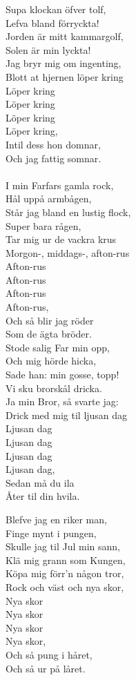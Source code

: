 \vspace{10pt}
Supa klockan öfver tolf,\\
Lefva bland förryckta!\\
Jorden är mitt kammargolf,\\
Solen är min lyckta!\\
Jag bryr mig om ingenting,\\
Blott at hjernen löper kring \\
	Löper kring\\
	Löper kring\\
	Löper kring\\
	Löper kring,\\
Intil dess hon domnar,\\
Och jag fattig somnar.\\
	 \\
I min Farfars gamla rock,\\
Hål uppå armbågen,\\
Står jag bland en lustig flock,\\
Super bara rågen,\\
Tar mig ur de vackra krus\\
Morgon-, middags-, afton-rus\\
	 Afton-rus\\
	 Afton-rus\\
	 Afton-rus\\
	 Afton-rus,\\
Och så blir jag röder\\
Som de ägta bröder.\\

Stode salig Far min opp,\\
Och mig hörde hicka,\\
Sade han: min gosse, topp!\\
Vi sku brorskål dricka.\\
Ja min Bror, så svarte jag:\\
Drick med mig til ljusan dag\\
	 Ljusan dag\\
	 Ljusan dag\\
	 Ljusan dag\\
	 Ljusan dag,\\
Sedan må du ila\\
Åter til din hvila.\par
\vspace{10pt}

Blefve jag en riker man,\\
Finge mynt i pungen,\\
Skulle jag til Jul min sann,\\
Klä mig grann som Kungen,\\
Köpa mig förr'n någon tror,\\
Rock och väst och nya skor,\\
	 Nya skor\\
	 Nya skor\\
	 Nya skor\\
	 Nya skor,\\
Och så pung i håret,\\
Och så ur på låret.\\
	 \\

